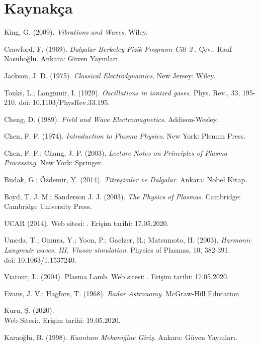 \documentclass[a4paper,11pt]{article}
\newcommand{\MYhref}[3][blue]{\href{#2}{\color{#1}{#3}}}%
\begin{document}
\section{Kaynakça}
\begin{thebibliography}{99}
	
	 King, G. (2009).\textit{ Vibrations and Waves}. Wiley. 
	
	 Crawford, F. (1969).  \textit{Dalgalar Berkeley Fizik Programı Cilt 2} . Çev., Rauf Nasuhoğlu. Ankara: Güven Yayınları.
	
	 Jackson, J. D. (1975).\textit{ Classical Electrodynamics}. New Jersey: Wiley. 
	
	 Tonks, L.; Langmuir, I. (1929). \textit{Oscillations in ionized gases}. Phys. Rev., 33, 195-210. doi: 10.1103/PhysRev.33.195.
	
	 Cheng, D. (1989).  \textit{Field and Wave Electromagnetics}. Addison-Wesley. 
	
	 Chen, F. F. (1974). \textit{Introduction to Plasma Physics}. New York: Plenum Press.
	
	 Chen, F. F.; Chang, J. P. (2003).\textit{ Lecture Notes on Principles of Plasma Processing}. New York: Springer. 
	
	 Budak, G.; Özdemir, Y. (2014).
    \textit{Titreşimler ve Dalgalar}. Ankara: Nobel Kitap.
    
	 Boyd, T. J. M.; Sanderson J. J. (2003). \textit{The Physics of Plasmas}. Cambridge: Cambridge University Press.	
	
	 UCAR (2014).  Web sitesi: \MYhref[blue]{https://scied.ucar.edu/ionosphere}{https://scied.ucar.edu/ionosphere}. Erişim tarihi: 17.05.2020.
	
	 Umeda, T.; Omura, Y.; Yoon, P.; Gaelzer, R.; Matsumoto, H. (2003). \textit{Harmonic Langmuir waves. III. Vlasov simulation}. Physics of Plasmas, 10, 382-391. \\ doi: 10.1063/1.1537240.
	
	 Viatour, L. (2004). Plasma Lamb. Web sitesi:  \MYhref[blue]{https://lucnix.be/}{https://lucnix.be/}. Erişim tarihi: 17.05.2020.
	
	 Evans, J. V.; Hagfors, T. (1968). \textit{Radar Astronomy}. McGraw-Hill Education.
	
	 Kuru, Ş. (2020).\\ Web Sitesi:\MYhref[blue]{https://acikders.ankara.edu.tr/course/view.php?id=6869}{https://acikders.ankara.edu.tr/course/view.php?id=6869}. Erişim tarihi: 19.05.2020.
	
	 Karaoğlu, B. (1998). \textit{Kuantum Mekaniğine Giriş}. Ankara: Güven Yayınları.
	
	
\end{thebibliography}


	
\end{document}
